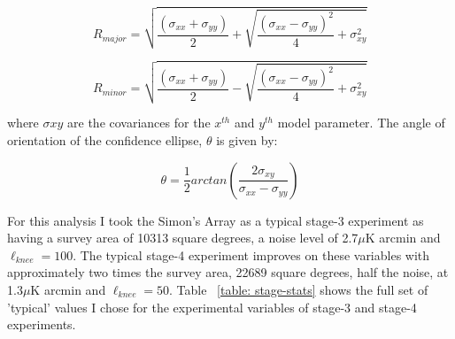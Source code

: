 \begin{equation}
R_{major} = \sqrt{\frac{(\sigma_{xx} + \sigma_{yy})}{2} + \sqrt{\frac{(\sigma_{xx} - \sigma_{yy})^2}{4} + \sigma_{xy}^2}}
\end{equation}

\begin{equation}
R_{minor} = \sqrt{\frac{(\sigma_{xx} + \sigma_{yy})}{2} - \sqrt{\frac{(\sigma_{xx} - \sigma_{yy})^2}{4} + \sigma_{xy}^2}}
\end{equation}

where $\sigma{xy}$ are the covariances for the $x^{th}$ and $y^{th}$ model parameter. The angle of orientation of the confidence ellipse, $\theta$ is given by:

\begin{equation}
\theta = \frac{1}{2}arctan(\frac{2\sigma_{xy}}{\sigma_{xx}-\sigma_{yy}})
\end{equation}

For this analysis I took the Simon's Array as a typical stage-3 experiment as having a survey area of 10313 square degrees, a noise level of 2.7$\mu$K arcmin and $\ell_{knee} = 100$. The typical stage-4 experiment improves on these variables with approximately two times the survey area, 22689 square degrees, half the noise, at 1.3$\mu$K arcmin and $\ell_{knee} = 50$. Table ~\ref{table: stage-stats} shows the full set of 'typical' values I chose for the experimental variables of stage-3 and stage-4 experiments.

